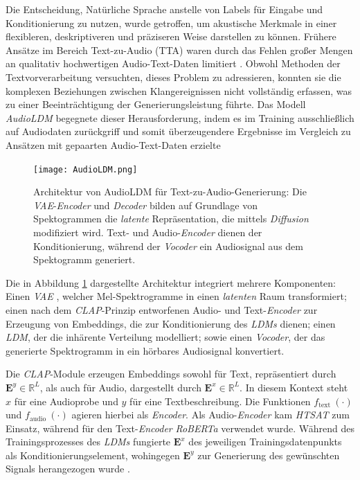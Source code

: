 \documentclass[
  a4paper,  %
  twoside,  %
  bibliography=totoc,
  headsepline,
  cleardoublepage=empty,
  parskip=half,
  draft=false
]{scrbook}
\begin{document}
Die Entscheidung, Natürliche Sprache anstelle von Labels für Eingabe und Konditionierung zu nutzen, wurde getroffen, um akustische Merkmale in einer flexibleren, deskriptiveren und präziseren Weise darstellen zu können. Frühere Ansätze im Bereich Text-zu-Audio (TTA) waren durch das Fehlen großer Mengen an qualitativ hochwertigen Audio-Text-Daten limitiert \cite{liu_separate_2022}. Obwohl Methoden der Textvorverarbeitung \cite{gemmeke_audio_2017, yang_diffsound_2023} versuchten, dieses Problem zu adressieren, konnten sie die komplexen Beziehungen zwischen Klangereignissen nicht vollständig erfassen, was zu einer Beeinträchtigung der Generierungsleistung führte. Das Modell \emph{AudioLDM} begegnete dieser Herausforderung, indem es im Training ausschließlich auf Audiodaten zurückgriff und somit überzeugendere Ergebnisse im Vergleich zu Ansätzen mit gepaarten Audio-Text-Daten erzielte \cite{liu_audioldm_2023}


\begin{figure}[h]
  \centering
  \texttt{[image: AudioLDM.png]}
  \caption[AudioLDM Architektur]{Architektur von AudioLDM für Text-zu-Audio-Generierung: Die \emph{VAE}-\emph{Encoder} und \emph{Decoder} bilden auf Grundlage von Spektogrammen die \emph{latente} Repräsentation, die mittels \emph{Diffusion} modifiziert wird. Text- und Audio-\emph{Encoder} dienen der Konditionierung, während der \emph{Vocoder} ein Audiosignal aus dem Spektogramm generiert. \cite{liu_audioldm_2023}}
  \label{fig:AudioLDM}
\end{figure} 

Die in Abbildung \ref{fig:AudioLDM} dargestellte Architektur integriert mehrere Komponenten: Einen \emph{VAE} \cite{kingma_auto-encoding_2022}, welcher Mel-Spektrogramme in einen \emph{latenten} Raum transformiert; einen nach dem \emph{CLAP}-Prinzip \cite{wu_large-scale_2023} entworfenen Audio- und Text-\emph{Encoder} zur Erzeugung von Embeddings, die zur Konditionierung des \emph{LDMs} dienen; einen \emph{LDM}, der die inhärente Verteilung modelliert; sowie einen \emph{Vocoder}, der das generierte Spektrogramm in ein hörbares Audiosignal konvertiert. \cite{liu_audioldm_2023}

Die \emph{CLAP}-Module erzeugen Embeddings sowohl für Text, repräsentiert durch $\boldsymbol{E}^y \in \mathbb{R}^L$, als auch für Audio, dargestellt durch $\boldsymbol{E}^x \in \mathbb{R}^L$. In diesem Kontext steht $x$ für eine Audioprobe und $y$ für eine Textbeschreibung. Die Funktionen $f_{\text {text }}(\cdot)$ und $f_{\text {audio }}(\cdot)$ agieren hierbei als \emph{Encoder}. Als Audio-\emph{Encoder} kam \emph{HTSAT} \cite{chen_hts-at_2022} zum Einsatz, während für den Text-\emph{Encoder} \emph{RoBERTa} \cite{liu_roberta_2019} verwendet wurde. Während des Trainingsprozesses des \emph{LDMs} fungierte $\boldsymbol{E}^x$ des jeweiligen Trainingsdatenpunkts als Konditionierungselement, wohingegen $\boldsymbol{E}^y$ zur Generierung des gewünschten Signals herangezogen wurde \cite{liu_audioldm_2023}.
\end{document}
